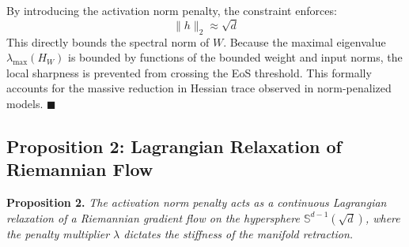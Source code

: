 \documentclass[11pt,a4paper]{article}
\begin{document}
By introducing the activation norm penalty, the constraint enforces:
\begin{equation}
\|h\|_2 \approx \sqrt{d}
\end{equation}
This directly bounds the spectral norm of $W$. Because the maximal eigenvalue $\lambda_{\text{max}}(H_W)$ is bounded by functions of the bounded weight and input norms, the local sharpness is prevented from crossing the EoS threshold. This formally accounts for the massive reduction in Hessian trace observed in norm-penalized models. $\blacksquare$

\subsection{Proposition 2: Lagrangian Relaxation of Riemannian Flow}
\textbf{Proposition 2.} \textit{The activation norm penalty acts as a continuous Lagrangian relaxation of a Riemannian gradient flow on the hypersphere $\mathbb{S}^{d-1}(\sqrt{d})$, where the penalty multiplier $\lambda$ dictates the stiffness of the manifold retraction.}
\end{document}
